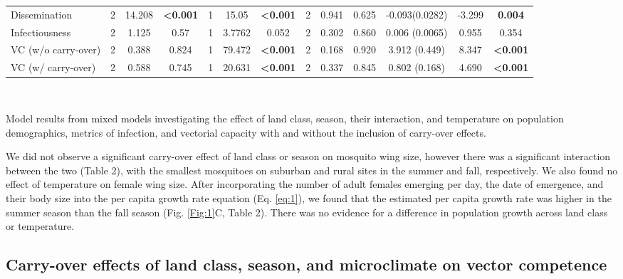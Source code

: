 \documentclass[12pt]{article}
\begin{document}
\begin{table}
{\begin{tabular}{|l|ccc|ccc|ccc|ccc|}
Dissemination               & 2           & 14.208    & \textbf{\textless0.001} & 1           & 15.05     & \textbf{\textless0.001} & 2           & 0.941     & 0.625                   & -0.093(0.0282)   & -3.299  & \textbf{0.004}          \\
Infectiousness              & 2           & 1.125     & 0.57                    & 1           & 3.7762    & 0.052                   & 2           & 0.302     & 0.860                   & 0.006 (0.0065)   & 0.955   & 0.354                   \\
VC (w/o carry-over)         & 2           & 0.388     & 0.824                   & 1           & 79.472    & \textbf{\textless0.001} & 2           & 0.168     & 0.920                   & 3.912 (0.449)    & 8.347   & \textbf{\textless0.001} \\
VC (w/ carry-over)          & 2           & 0.588     & 0.745                   & 1           & 20.631    & \textbf{\textless0.001} & 2           & 0.337     & 0.845                   & 0.802 (0.168)    & 4.690   & \textbf{\textless0.001} \\
\hline
\end{tabular}}
\\[1.5pt]
\begin{flushleft}
Model results from mixed models investigating the effect of land class, season, their interaction, and temperature on population demographics, metrics of infection, and vectorial capacity with and without the inclusion of carry-over effects.
\end{flushleft}
\end{table}

We did not observe a significant carry-over effect of land class or season on mosquito wing size, however there was a significant interaction between the two (Table 2), with the smallest mosquitoes on suburban and rural sites in the summer and fall, respectively. We also found no effect of temperature on female wing size. After incorporating the number of adult females emerging per day, the date of emergence, and their body size into the per capita growth rate equation (Eq. \ref{eq:1}), we found that the estimated per capita growth rate was higher in the summer season than the fall season (Fig. \ref{Fig:1}C, Table 2). There was no evidence for a difference in population growth across land class or temperature.

\subsection{Carry-over effects of land class, season, and microclimate on vector competence}
\end{document}
